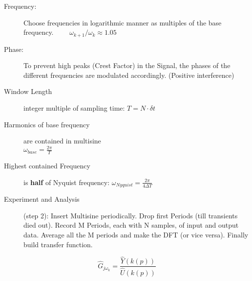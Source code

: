 \begin{tcolorbox}[colback=brown!5!white,colframe=brown!75!black,title=Optimising Multisine for optimal crest factor]
\begin{description}
\item[Frequency:] Choose frequencies in logarithmic manner as multiples of the base frequency. $\qquad \omega_{k+1}/\omega_{k} \approx 1.05$
\item[Phase:] To prevent high peaks (Crest Factor) in the Signal, the phases of the different frequencies are modulated accordingly. (Positive interference)
\end{description}
\end{tcolorbox}

\begin{tcolorbox}[colback=brown!5!white,colframe=brown!75!black,title=Multisine Identification Implementation procedure]
\begin{description}
\item[Window Length] integer multiple of sampling time:  \( T = N \cdot \delta t\)
\item[Harmonics of base frequency] are contained in multisine \\ \( {\omega}_{base} = \frac{2 \pi}{T}\)
\item[Highest contained Frequency] is \textbf{half} of Nyquist frequency: \( {\omega}_{Nyquist}  = \frac{2 \pi}{4 \Delta T}\)

\item[Experiment and Analysis] (step 2): Insert Multisine periodically. Drop first Periods (till transients died out). Record M Periods, each with N samples, of input and output data. Average all the M periods and make the DFT (or vice versa). Finally build transfer function.
\end{description}

\begin{equation*}
{\hat{G} _{j{\omega}_{k}}}=\frac{\hat{Y}(k(p))}{\hat{U}(k(p))}
\end{equation*}
\end{tcolorbox}




